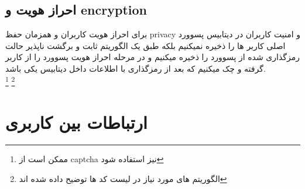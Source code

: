 \documentclass[12pt]{article}
\begin{document}
\subsection{احراز هویت و encryption}
برای احراز هویت کاربران و همزمان حفظ privacy و امنیت کاربران
در دیتابیس پسوورد اصلی کاربر ها را ذخیره نمیکنیم
بلکه طبق یک الگوریتم ثابت و برگشت ناپذیر حالت رمزگذاری شده
از پسوورد را ذخیره میکنیم و در مرحله احراز هویت پسوورد را
از کاربر گرفته و چک میکنیم که بعد از رمزگذاری با اطلاعات
داخل دیتابیس یکی باشد.\\
\footnote{ممکن است از captcha نیز استفاده شود}
\footnote{الگوریتم های مورد نیاز در لیست کد ها توضیح داده
    شده اند}
\pagebreak
\section{ارتباطات بین کاربری}
\end{document}
